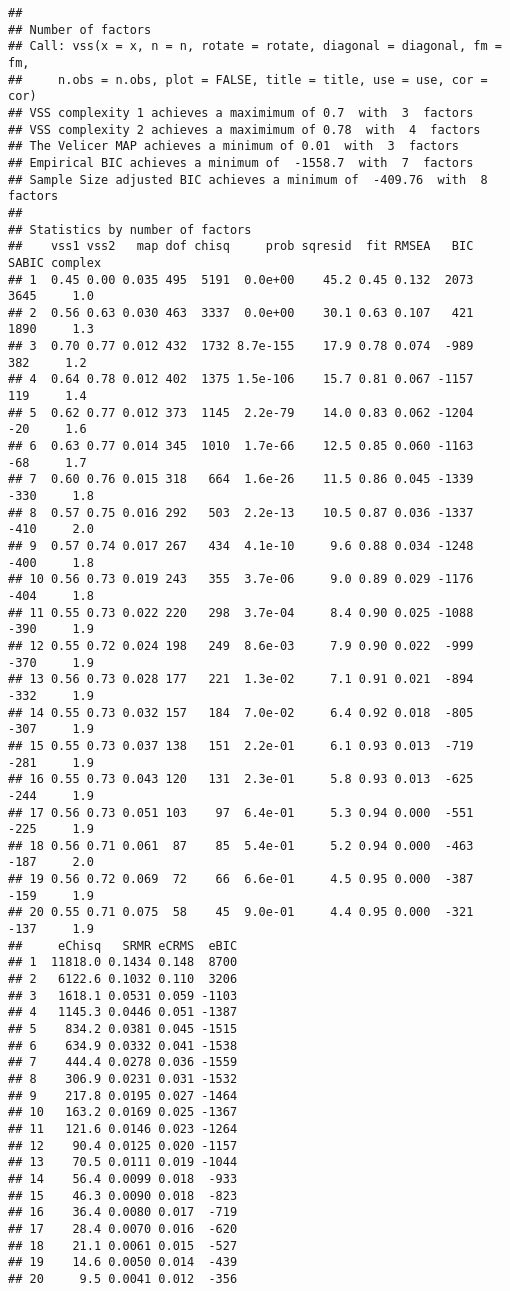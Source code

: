 \documentclass[
]{article}
\begin{document}
\begin{verbatim}
## 
## Number of factors
## Call: vss(x = x, n = n, rotate = rotate, diagonal = diagonal, fm = fm, 
##     n.obs = n.obs, plot = FALSE, title = title, use = use, cor = cor)
## VSS complexity 1 achieves a maximimum of 0.7  with  3  factors
## VSS complexity 2 achieves a maximimum of 0.78  with  4  factors
## The Velicer MAP achieves a minimum of 0.01  with  3  factors 
## Empirical BIC achieves a minimum of  -1558.7  with  7  factors
## Sample Size adjusted BIC achieves a minimum of  -409.76  with  8  factors
## 
## Statistics by number of factors 
##    vss1 vss2   map dof chisq     prob sqresid  fit RMSEA   BIC SABIC complex
## 1  0.45 0.00 0.035 495  5191  0.0e+00    45.2 0.45 0.132  2073  3645     1.0
## 2  0.56 0.63 0.030 463  3337  0.0e+00    30.1 0.63 0.107   421  1890     1.3
## 3  0.70 0.77 0.012 432  1732 8.7e-155    17.9 0.78 0.074  -989   382     1.2
## 4  0.64 0.78 0.012 402  1375 1.5e-106    15.7 0.81 0.067 -1157   119     1.4
## 5  0.62 0.77 0.012 373  1145  2.2e-79    14.0 0.83 0.062 -1204   -20     1.6
## 6  0.63 0.77 0.014 345  1010  1.7e-66    12.5 0.85 0.060 -1163   -68     1.7
## 7  0.60 0.76 0.015 318   664  1.6e-26    11.5 0.86 0.045 -1339  -330     1.8
## 8  0.57 0.75 0.016 292   503  2.2e-13    10.5 0.87 0.036 -1337  -410     2.0
## 9  0.57 0.74 0.017 267   434  4.1e-10     9.6 0.88 0.034 -1248  -400     1.8
## 10 0.56 0.73 0.019 243   355  3.7e-06     9.0 0.89 0.029 -1176  -404     1.8
## 11 0.55 0.73 0.022 220   298  3.7e-04     8.4 0.90 0.025 -1088  -390     1.9
## 12 0.55 0.72 0.024 198   249  8.6e-03     7.9 0.90 0.022  -999  -370     1.9
## 13 0.56 0.73 0.028 177   221  1.3e-02     7.1 0.91 0.021  -894  -332     1.9
## 14 0.55 0.73 0.032 157   184  7.0e-02     6.4 0.92 0.018  -805  -307     1.9
## 15 0.55 0.73 0.037 138   151  2.2e-01     6.1 0.93 0.013  -719  -281     1.9
## 16 0.55 0.73 0.043 120   131  2.3e-01     5.8 0.93 0.013  -625  -244     1.9
## 17 0.56 0.73 0.051 103    97  6.4e-01     5.3 0.94 0.000  -551  -225     1.9
## 18 0.56 0.71 0.061  87    85  5.4e-01     5.2 0.94 0.000  -463  -187     2.0
## 19 0.56 0.72 0.069  72    66  6.6e-01     4.5 0.95 0.000  -387  -159     1.9
## 20 0.55 0.71 0.075  58    45  9.0e-01     4.4 0.95 0.000  -321  -137     1.9
##     eChisq   SRMR eCRMS  eBIC
## 1  11818.0 0.1434 0.148  8700
## 2   6122.6 0.1032 0.110  3206
## 3   1618.1 0.0531 0.059 -1103
## 4   1145.3 0.0446 0.051 -1387
## 5    834.2 0.0381 0.045 -1515
## 6    634.9 0.0332 0.041 -1538
## 7    444.4 0.0278 0.036 -1559
## 8    306.9 0.0231 0.031 -1532
## 9    217.8 0.0195 0.027 -1464
## 10   163.2 0.0169 0.025 -1367
## 11   121.6 0.0146 0.023 -1264
## 12    90.4 0.0125 0.020 -1157
## 13    70.5 0.0111 0.019 -1044
## 14    56.4 0.0099 0.018  -933
## 15    46.3 0.0090 0.018  -823
## 16    36.4 0.0080 0.017  -719
## 17    28.4 0.0070 0.016  -620
## 18    21.1 0.0061 0.015  -527
## 19    14.6 0.0050 0.014  -439
## 20     9.5 0.0041 0.012  -356
\end{verbatim}
\end{document}
